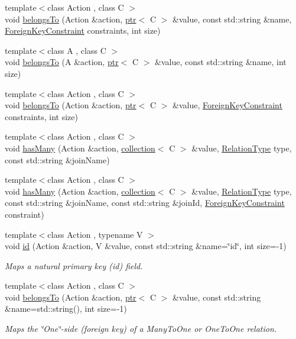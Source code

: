 \begin{DoxyCompactItemize}
{\footnotesize template$<$class Action , class C $>$ }\\void \hyperlink{namespacedbo_a5137d8e177f585a8be34d5b2308ffe44}{belongs\+To} (Action \&action, \hyperlink{classdbo_1_1ptr}{ptr}$<$ C $>$ \&value, const std\+::string \&name, \hyperlink{classdbo_1_1_foreign_key_constraint}{Foreign\+Key\+Constraint} constraints, int size)
\item 
{\footnotesize template$<$class A , class C $>$ }\\void \hyperlink{namespacedbo_a176633d717519df26153453ef88eb9f4}{belongs\+To} (A \&action, \hyperlink{classdbo_1_1ptr}{ptr}$<$ C $>$ \&value, const std\+::string \&name, int size)
\item 
{\footnotesize template$<$class Action , class C $>$ }\\void \hyperlink{namespacedbo_a520ac67a45a637201f5ce05d164a96ad}{belongs\+To} (Action \&action, \hyperlink{classdbo_1_1ptr}{ptr}$<$ C $>$ \&value, \hyperlink{classdbo_1_1_foreign_key_constraint}{Foreign\+Key\+Constraint} constraints, int size)
\item 
{\footnotesize template$<$class Action , class C $>$ }\\void \hyperlink{namespacedbo_aa10dd5a869d15f3883120b81daee7e0c}{has\+Many} (Action \&action, \hyperlink{classdbo_1_1collection}{collection}$<$ C $>$ \&value, \hyperlink{namespacedbo_ab7f92e64aea13b1e3b60021e72a9fc73}{Relation\+Type} type, const std\+::string \&join\+Name)
\item 
{\footnotesize template$<$class Action , class C $>$ }\\void \hyperlink{namespacedbo_a709ba218243298afbbb41036c538c942}{has\+Many} (Action \&action, \hyperlink{classdbo_1_1collection}{collection}$<$ C $>$ \&value, \hyperlink{namespacedbo_ab7f92e64aea13b1e3b60021e72a9fc73}{Relation\+Type} type, const std\+::string \&join\+Name, const std\+::string \&join\+Id, \hyperlink{classdbo_1_1_foreign_key_constraint}{Foreign\+Key\+Constraint} constraint)
\item 
{\footnotesize template$<$class Action , typename V $>$ }\\void \hyperlink{namespacedbo_a4769c8262861d08762603687afb42550}{id} (Action \&action, V \&value, const std\+::string \&name=\char`\"{}id\char`\"{}, int size=-\/1)
\begin{DoxyCompactList}\small\item\em Maps a natural primary key (id) field. \end{DoxyCompactList}\item 
{\footnotesize template$<$class Action , class C $>$ }\\void \hyperlink{namespacedbo_a98c6fb4630710b2f9ac0b624a4f6dc35}{belongs\+To} (Action \&action, \hyperlink{classdbo_1_1ptr}{ptr}$<$ C $>$ \&value, const std\+::string \&name=std\+::string(), int size=-\/1)
\begin{DoxyCompactList}\small\item\em Maps the \char`\"{}\+One\char`\"{}-\/side (foreign key) of a Many\+To\+One or One\+To\+One relation. \end{DoxyCompactList}\end{DoxyCompactItemize}
